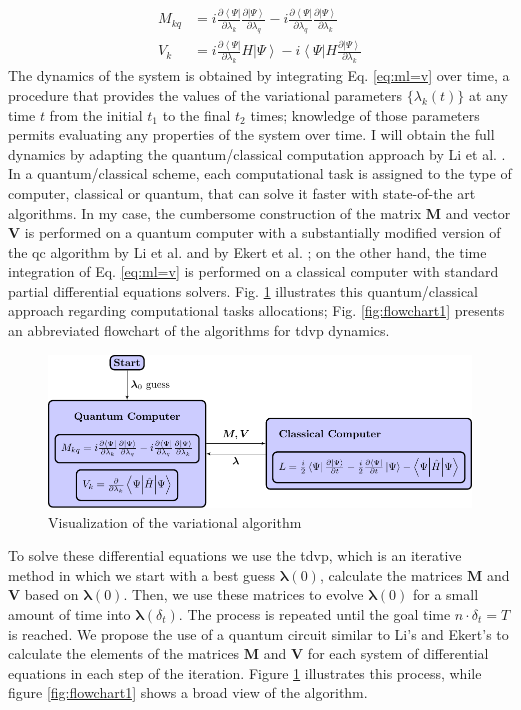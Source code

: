 \documentclass{aux/ttuthes2007}
\newcommand{\bra}[1]{\ensuremath{\left\langle#1\right\vert}}
\newcommand{\ket}[1]{\ensuremath{\left|#1\right\rangle}}
\newcommand{\kpp}[1]{\frac{\partial \ket\Psi}{\partial #1}}
\newcommand{\bpp}[1]{\frac{\partial \bra\Psi}{\partial #1}}
\begin{document}
%
\begin{equation*}
	\begin{split}
		M_{kq} &= i\bpp{\lambda_k} \kpp{\lambda_q} - i\bpp{\lambda_q} \kpp{\lambda_k} \\
		V_{k} &= i\bpp{\lambda_k} H \ket \Psi - i\bra \Psi H \kpp{\lambda_k} 
	\end{split}
\end{equation*}
%
The dynamics of the system is obtained by integrating Eq. \ref{eq:ml=v} over time, a procedure that provides the values of the variational parameters $\{\lambda_k(t)\}$ at any time $t$ from the initial $t_1$ to the final $t_2$ times;
knowledge of those parameters permits evaluating any properties of the system over time.
I will obtain the full dynamics by adapting the quantum/classical computation approach by Li et al. .
In a quantum/classical scheme, each computational task is assigned to the type of computer, classical or quantum, that can solve it faster with state-of-the art algorithms.
In my case, the cumbersome construction of the matrix $\bm M$ and vector $\bm V$ is performed on a quantum computer with a substantially modified version of the \gls{qc} algorithm by Li et al.  and by Ekert et al. ;
on the other hand, the time integration of Eq. \ref{eq:ml=v} is performed on a classical computer with standard partial differential equations solvers.
Fig. \ref{fig:TDVP} illustrates this quantum/classical approach regarding computational tasks allocations;
Fig. \ref{fig:flowchart1} presents an abbreviated flowchart of the algorithms for \gls{tdvp} dynamics.
%
\begin{figure}
	\centering
  \includegraphics[width=\linewidth]{img/variation_figure.pdf}
  \caption{Visualization of the variational algorithm}
  \label{fig:TDVP}
\end{figure}
%
To solve these differential equations we use the \gls{tdvp}, which is an iterative method in which we start with a best guess $\bm \lambda(0)$, calculate the matrices $\bm M$ and $\bm V$ based on $\bm \lambda(0)$.
Then, we use these matrices to evolve $\bm \lambda(0)$ for a small amount of time into $\bm \lambda(\delta_t)$.
The process is repeated until the goal time $n\cdot\delta_t = T$ is reached.
We propose the use of a quantum circuit similar to Li's \cite{benjamin} and Ekert's  to calculate the elements of the matrices $\bm M$ and $\bm V$ for each system of differential equations in each step of the iteration.
Figure \ref{fig:TDVP} illustrates this process, while figure \ref{fig:flowchart1} shows a broad view of the algorithm.
\end{document}

